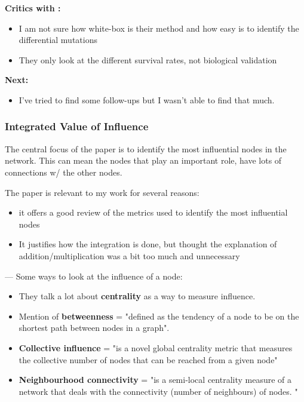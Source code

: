 \textbf{Critics with \citet{He2017-dj}:}
\begin{itemize}
    \item I am not sure how white-box is their method and how easy is to identify the differential mutations
    \item They only look at the different survival rates, not biological validation
\end{itemize}

\textbf{Next:}
\begin{itemize}
    \item I've tried to find some follow-ups but I wasn't able to find that much.
\end{itemize}


\subsubsection{Integrated Value of Influence}

The central focus of the paper is to identify the most influential nodes in the network. This can mean the nodes that play an important role, have lots of connections w/ the other nodes. 

The paper is relevant to my work for several reasons:
\begin{itemize}
    \item it offers a good review of the metrics used to identify the most influential nodes
    \item  It justifies how the integration is done, but thought the explanation of addition/multiplication was a bit too much and unnecessary
\end{itemize}

--- 
Some ways to look at the influence of a node: 

\begin{itemize}
    \item They talk a lot about \textbf{centrality} as a way to measure influence.
    \item Mention of \textbf{betweenness} = "defined as the tendency of a node to be on the shortest path between nodes in a graph".
    \item \textbf{Collective influence} =  "is a novel global centrality metric that measures the collective number of nodes that can be reached from a given node" 
    \item\textbf{ Neighbourhood connectivity} = "is a semi-local centrality measure of a network that deals with the connectivity (number of neighbours) of nodes. "

\end{itemize}

